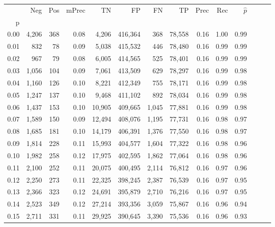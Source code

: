 \begin{tabular}{rrrrrrrrrrrrrr}
\toprule
{} &     Neg &    Pos & mPrec &       TN &       FP &      FN &      TP &  Prec &   Rec & $\hat{p}$ \\
p    &         &        &       &          &          &         &         &       &       &           \\
\midrule
0.00 &   4,206 &    368 &  0.08 &    4,206 &  416,364 &     368 &  78,558 &  0.16 &  1.00 &      0.99 \\
0.01 &     832 &     78 &  0.09 &    5,038 &  415,532 &     446 &  78,480 &  0.16 &  0.99 &      0.99 \\
0.02 &     967 &     79 &  0.08 &    6,005 &  414,565 &     525 &  78,401 &  0.16 &  0.99 &      0.99 \\
0.03 &   1,056 &    104 &  0.09 &    7,061 &  413,509 &     629 &  78,297 &  0.16 &  0.99 &      0.98 \\
0.04 &   1,160 &    126 &  0.10 &    8,221 &  412,349 &     755 &  78,171 &  0.16 &  0.99 &      0.98 \\
0.05 &   1,247 &    137 &  0.10 &    9,468 &  411,102 &     892 &  78,034 &  0.16 &  0.99 &      0.98 \\
0.06 &   1,437 &    153 &  0.10 &   10,905 &  409,665 &   1,045 &  77,881 &  0.16 &  0.99 &      0.98 \\
0.07 &   1,589 &    150 &  0.09 &   12,494 &  408,076 &   1,195 &  77,731 &  0.16 &  0.98 &      0.97 \\
0.08 &   1,685 &    181 &  0.10 &   14,179 &  406,391 &   1,376 &  77,550 &  0.16 &  0.98 &      0.97 \\
0.09 &   1,814 &    228 &  0.11 &   15,993 &  404,577 &   1,604 &  77,322 &  0.16 &  0.98 &      0.96 \\
0.10 &   1,982 &    258 &  0.12 &   17,975 &  402,595 &   1,862 &  77,064 &  0.16 &  0.98 &      0.96 \\
0.11 &   2,100 &    252 &  0.11 &   20,075 &  400,495 &   2,114 &  76,812 &  0.16 &  0.97 &      0.96 \\
0.12 &   2,250 &    273 &  0.11 &   22,325 &  398,245 &   2,387 &  76,539 &  0.16 &  0.97 &      0.95 \\
0.13 &   2,366 &    323 &  0.12 &   24,691 &  395,879 &   2,710 &  76,216 &  0.16 &  0.97 &      0.95 \\
0.14 &   2,523 &    349 &  0.12 &   27,214 &  393,356 &   3,059 &  75,867 &  0.16 &  0.96 &      0.94 \\
0.15 &   2,711 &    331 &  0.11 &   29,925 &  390,645 &   3,390 &  75,536 &  0.16 &  0.96 &      0.93 \\

\end{tabular}
